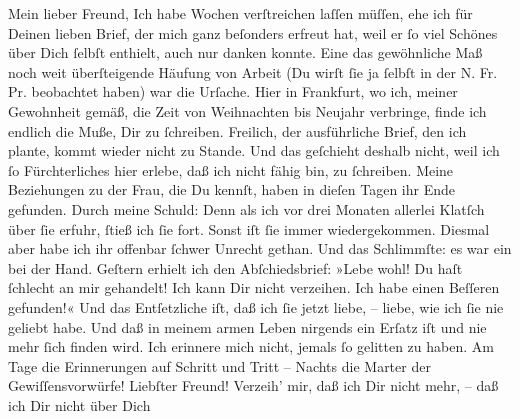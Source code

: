 \begin{ledgroupsized}[t]{13cm}
           \pstart{}Mein lieber Freund,\pend\pstart
           Ich habe Wochen verſtreichen laſſen müſſen, ehe ich für Deinen lieben Brief, der mich
               ganz beſonders erfreut hat, weil er ſo viel Schönes über Dich ſelbſt enthielt, auch
               nur danken konnte. Eine das gewöhnliche Maß noch weit überſteigende Häufung von
               Arbeit (Du wirſt ſie ja ſelbſt in der N. Fr. Pr.
               beobachtet haben) war die Urſache. Hier in Frankfurt, wo ich, meiner Gewohnheit gemäß, die Zeit von Weihnachten bis Neujahr
               verbringe, finde ich endlich die {\pb}Muße, Dir zu
               ſchreiben. Freilich, der ausführliche Brief, den ich plante, kommt wieder nicht zu
               Stande. Und das geſchieht deshalb nicht, weil ich ſo Fürchterliches hier erlebe, daß
               ich nicht fähig bin, zu ſchreiben. Meine Beziehungen zu der Frau, die Du kennſt, haben in dieſen Tagen
               ihr Ende gefunden. Durch meine Schuld: Denn als ich vor drei Monaten allerlei Klatſch
               über ſie erfuhr, ſtieß ich ſie fort. Sonst iſt ſie immer wiedergekommen. Diesmal aber
               habe ich ihr offenbar ſchwer Unrecht gethan. Und das Schlimmſte: es war ein \label{K_L03231-3v}\label{K_L03231-3h} bei der Hand.
                  Geſtern erhielt ich den Abſchiedsbrief: »Lebe wohl!
               Du haſt ſchlecht an mir gehandelt! Ich kann Dir nicht verzeihen. Ich habe einen Beſſeren gefunden!«\pend
           \pstart
           Und das Entſetzliche iſt, daß ich ſie jetzt liebe, – liebe, wie ich ſie nie geliebt
               habe. Und daß in meinem armen Leben nirgends ein Erſatz iſt und nie mehr ſich finden
               wird. Ich erinnere mich nicht, jemals ſo gelitten zu haben. Am Tage die Erinnerungen
               auf Schritt und Tritt – Nachts die Marter {\pb}der
               Gewiſſensvorwürfe!\pend
           \pstart
           Liebſter Freund! Verzeih’ mir, daß ich Dir nicht mehr, – daß ich Dir nicht über Dich

\end{ledgroupsized}
